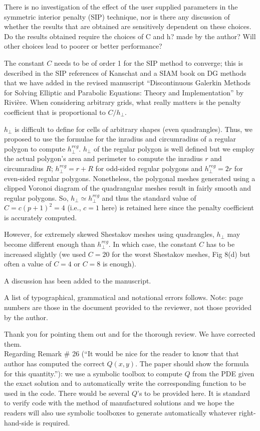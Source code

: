 \documentclass{article}
\begin{document}
\bigskip

{
\color{blue}
There is no investigation of the effect of the user supplied parameters in
the symmetric interior penalty (SIP) technique, nor is there any discussion
of whether the results that are obtained are sensitively dependent on these
choices. Do the results obtained require the choices of C and h? made by
the author? Will other choices lead to poorer or better performance?
}


The constant $C$ needs to be of order 1 for the SIP method to converge; this is described in the SIP references of Kanschat and a SIAM book on DG methods that we have added in the revised manuscript ``Discontinuous Galerkin Methods for Solving Elliptic and Parabolic Equations:  Theory and Implementation'' by Rivi\`ere. When considering arbitrary grids, what really matters is the penalty coefficient that is proportional to $C/h_\perp$.

$h_\perp$ is difficult to 
define for cells of arbitrary shapes (even quadrangles). Thus, we proposed to use the formulae
for the inradius and circumradius of a regular polygon to compute $h^{reg}_\perp$. $h_\perp$ of the regular polygon
is well defined but we employ the actual polygon's area and perimeter to
compute the inradius $r$ and circumradius $R$; $h^{reg}_\perp=r+R$ for odd-sided regular polygons and $h^{reg}_\perp=2r$
for even-sided regular polygons. Nonetheless, the polygonal meshes generated using a clipped Voronoi diagram of the
quadrangular meshes result in fairly smooth and regular polygons. So, $h_\perp \simeq h^{reg}_\perp$ and thus the standard value of $C=c(p+1)^2=4$ (i.e., $c=1$ here) is retained here since the penalty coefficient is accurately computed. 


However, for extremely skewed Shestakov meshes using quadrangles, $h_\perp $ may become different enough than $h^{reg}_\perp$. In which case, the constant $C$ has to be increased slightly (we used $C=20$ for the worst Shestakov meshes, Fig 8(d) but often a value of $C=4$ or $C=8$ is enough). 

A discussion has been added to the manuscript.

\bigskip


{
\color{blue}
A list of typographical, grammatical and notational errors follows. Note:
page numbers are those in the document provided to the reviewer, not those
provided by the author.
}

Thank you for pointing them out and for the thorough review. We have corrected them. \\

Regarding Remark \# 26 (``It would be nice for the reader to know that that author has computed the correct $Q(x, y)$. The paper should show the formula for this quantity.''): we use a symbolic toolbox to compute $Q$ from the PDE given the exact solution and to automatically write the corresponding function to be used in the code. There would be several $Q$'s to be provided here. It is standard to verify code with the method of manufactured solutions and we hope the readers will also use symbolic toolboxes to generate automatically whatever right-hand-side is required. 

\bigskip
\end{document}
